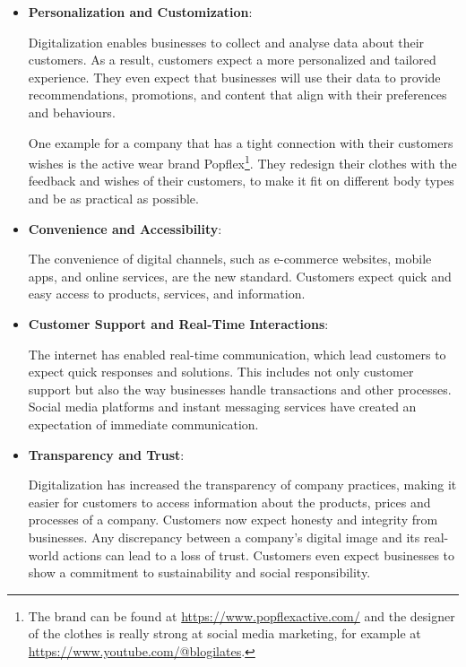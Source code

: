 \documentclass[a4]{scrartcl}
\begin{document}
\begin{itemize}
	
	
	
	\item \textbf{Personalization and Customization}: 
	
	Digitalization enables businesses to collect and analyse data about their customers. As a result, customers expect a more personalized and tailored experience. They even expect that businesses will use their data to provide recommendations, promotions, and content that align with their preferences and behaviours.~\cite{socialmedia, masterthesis, digitalmatrix, leadingdigital}
	
	One example for a company that has a tight connection with their customers wishes is the active wear brand Popflex\footnote{The brand can be found at \url{https://www.popflexactive.com/} and the designer of the clothes is really strong at social media marketing, for example at \url{https://www.youtube.com/@blogilates}.}. They redesign their clothes with the feedback and wishes of their customers, to make it fit on different body types and be as practical as possible.
	
	
	\item \textbf{Convenience and Accessibility}: 
	
	The convenience of digital channels, such as e-commerce websites, mobile apps, and online services, are the new standard. Customers expect quick and easy access to products, services, and information.~\cite{masterthesis, leadingdigital}
	
	
	
	\item \textbf{Customer Support and Real-Time Interactions}: 
	
	The internet has enabled real-time communication, which lead customers to expect quick responses and solutions. This includes not only customer support but also the way businesses handle transactions and other processes. Social media platforms and instant messaging services have created an expectation of immediate communication.~\cite{socialmedia, digitalmatrix, leadingdigital}
	
	
	\item \textbf{Transparency and Trust}: 
	
	Digitalization has increased the transparency of company practices, making it easier for customers to access information about the products, prices and processes of a company. Customers now expect honesty and integrity from businesses. Any discrepancy between a company's digital image and its real-world actions can lead to a loss of trust.
	Customers even expect businesses to show a commitment to sustainability and social responsibility.~\cite{trust}
	

\end{itemize}
\end{document}
